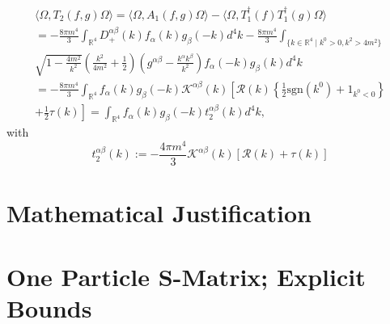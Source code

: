 \documentclass[b5paper,draft,openbib,12pt]{memoir}
\begin{document}
\begin{multline}
\langle \Omega, T_2 (f,g) \Omega \rangle = \langle \Omega, A_1 (f,g) \Omega \rangle - 
\langle \Omega, T_1^\dagger (f) T_1^\dagger (g) \Omega \rangle \\
= - \frac{8 \pi m^4}{3} \int_{\mathbb{R}^4} D_+^{\alpha \beta} (k) f_\alpha (k) g_\beta (-k) d^4k- \frac{8 \pi m^4}{3} \int_{\{k\in\mathbb{R}^4 \mid k^0>0, k^2 > 4 m^2 \}}\\
 \sqrt{1-\frac{4m^2}{k^2}} \left( \frac{k^2}{4m^2} + \frac{1}{2}\right) 
\left( g^{\alpha \beta} - \frac{k^\alpha k^\beta }{k^2}\right) f_\alpha (-k) g_\beta (k) d^4 k\\
= - \frac{8 \pi m^4}{3} \int_{\mathbb{R}^4} f_\alpha (k) g_\beta (-k) \mathcal{K}^{\alpha \beta} (k)
\left[ \mathcal{R}(k) \left\{ \frac{1}{2} \text{sgn} \left(k^0\right) + 1_{k^0<0}\right\} \right.\\
\left. +  \frac{1}{2}\tau(k) \right]
= \int_{\mathbb{R}^4} f_\alpha (k) g_\beta (-k) t_2^{\alpha \beta} (k) d^4 k,
\end{multline}
with 
\begin{equation}
t^{\alpha \beta}_2 (k) := - \frac{4 \pi m^4}{3}\mathcal{K}^{\alpha \beta }(k) \left[\mathcal{R}(k) + \tau(k) \right]
\end{equation}


\chapter{Mathematical Justification}


\appendix

\chapter[One Particle S-Matrix; Explicit Bounds][Explicit Bounds]{One Particle S-Matrix; Explicit Bounds}
\end{document}
